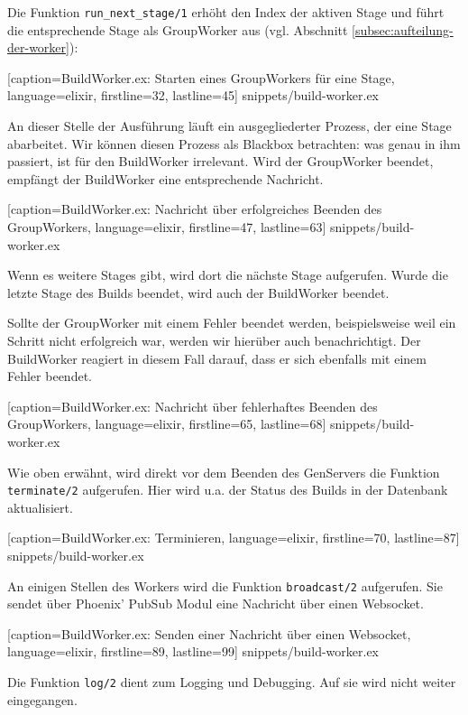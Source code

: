 Die Funktion \texttt{run\_\allowbreak next\_\allowbreak stage/1} erhöht den Index der aktiven Stage und führt die entsprechende Stage als GroupWorker aus (vgl. Abschnitt \ref{subsec:aufteilung-der-worker}):


  [caption={BuildWorker.ex: Starten eines GroupWorkers für eine Stage},
  language=elixir,
  firstline=32,
  lastline=45]
  {snippets/build-worker.ex}

An dieser Stelle der Ausführung läuft ein ausgegliederter Prozess, der eine Stage abarbeitet. Wir können diesen Prozess als Blackbox betrachten: was genau in ihm passiert, ist für den BuildWorker irrelevant. Wird der GroupWorker beendet, empfängt der BuildWorker eine entsprechende Nachricht.


  [caption={BuildWorker.ex: Nachricht über erfolgreiches Beenden des GroupWorkers},
  language=elixir,
  firstline=47,
  lastline=63]
  {snippets/build-worker.ex}

Wenn es weitere Stages gibt, wird dort die nächste Stage aufgerufen. Wurde die letzte Stage des Builds beendet, wird auch der BuildWorker beendet.

Sollte der GroupWorker mit einem Fehler beendet werden, beispielsweise weil ein Schritt nicht erfolgreich war, werden wir hierüber auch benachrichtigt. Der BuildWorker reagiert in diesem Fall darauf, dass er sich ebenfalls mit einem Fehler beendet.


  [caption={BuildWorker.ex: Nachricht über fehlerhaftes Beenden des GroupWorkers},
  language=elixir,
  firstline=65,
  lastline=68]
  {snippets/build-worker.ex}

Wie oben erwähnt, wird direkt vor dem Beenden des GenServers die Funktion \texttt{terminate/2} aufgerufen. Hier wird u.a. der Status des Builds in der Datenbank aktualisiert.


  [caption={BuildWorker.ex: Terminieren},
  language=elixir,
  firstline=70,
  lastline=87]
  {snippets/build-worker.ex}

An einigen Stellen des Workers wird die Funktion \texttt{broadcast/2} aufgerufen. Sie sendet über Phoenix' PubSub Modul eine Nachricht über einen Websocket.


  [caption={BuildWorker.ex: Senden einer Nachricht über einen Websocket},
  language=elixir,
  firstline=89,
  lastline=99]
  {snippets/build-worker.ex}

Die Funktion \texttt{log/2} dient zum Logging und Debugging. Auf sie wird nicht weiter eingegangen.


